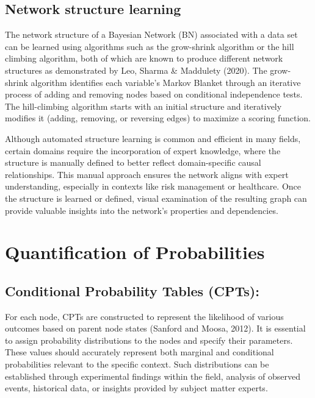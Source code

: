 \subsection{Network structure learning}
The network structure of a Bayesian Network (BN) associated with a data set can be learned using algorithms such as the grow-shrink algorithm or the hill climbing algorithm, both of which are known to produce different network structures as demonstrated by Leo, Sharma \& Maddulety (2020). The grow-shrink algorithm identifies each variable's Markov Blanket through an iterative process of adding and removing nodes based on conditional independence tests. The hill-climbing algorithm starts with an initial structure and iteratively modifies it (adding, removing, or reversing edges) to maximize a scoring function. 

Although automated structure learning is common and efficient in many fields, certain domains require the incorporation of expert knowledge, where the structure is manually defined to better reflect domain-specific causal relationships. This manual approach ensures the network aligns with expert understanding, especially in contexts like risk management or healthcare. Once the structure is learned or defined, visual examination of the resulting graph can provide valuable insights into the network’s properties and dependencies. 
\section{Quantification of Probabilities}
\subsection{Conditional Probability Tables (CPTs): }
For each node, CPTs are constructed to represent the likelihood of various outcomes based on parent node states (Sanford and Moosa, 2012). It is essential to assign probability distributions to the nodes and specify their parameters. These values should accurately represent both marginal and conditional probabilities relevant to the specific context. Such distributions can be established through experimental findings within the field, analysis of observed events, historical data, or insights provided by subject matter experts. 

